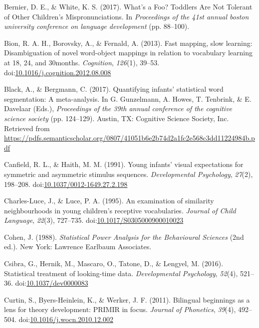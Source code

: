 \documentclass[man]{apa6}
\begin{document}
\leavevmode\hypertarget{ref-Bernier2017}{}%
Bernier, D. E., \& White, K. S. (2017). What's a Foo? Toddlers Are Not Tolerant of Other Children's Mispronunciations. In \emph{Proceedings of the 41st annual boston university conference on language development} (pp. 88--100).

\leavevmode\hypertarget{ref-Bion2013}{}%
Bion, R. A. H., Borovsky, A., \& Fernald, A. (2013). Fast mapping, slow learning: Disambiguation of novel word-object mappings in relation to vocabulary learning at 18, 24, and 30months. \emph{Cognition}, \emph{126}(1), 39--53. doi:\href{https://doi.org/10.1016/j.cognition.2012.08.008}{10.1016/j.cognition.2012.08.008}

\leavevmode\hypertarget{ref-Black2017}{}%
Black, A., \& Bergmann, C. (2017). Quantifying infants' statistical word segmentation: A meta-analysis. In G. Gunzelmann, A. Howes, T. Tenbrink, \& E. Davelaar (Eds.), \emph{Proceedings of the 39th annual conference of the cognitive science society} (pp. 124--129). Austin, TX: Cognitive Science Society, Inc. Retrieved from \url{https://pdfs.semanticscholar.org/0807/41051b6e2b74d2a1fc2e568c3dd11224984b.pdf}

\leavevmode\hypertarget{ref-Canfield1991}{}%
Canfield, R. L., \& Haith, M. M. (1991). Young infants' visual expectations for symmetric and asymmetric stimulus sequences. \emph{Developmental Psychology}, \emph{27}(2), 198--208. doi:\href{https://doi.org/10.1037/0012-1649.27.2.198}{10.1037/0012-1649.27.2.198}

\leavevmode\hypertarget{ref-CharlesLuce1995}{}%
Charles-Luce, J., \& Luce, P. A. (1995). An examination of similarity neighbourhoods in young children's receptive vocabularies. \emph{Journal of Child Language}, \emph{22}(3), 727--735. doi:\href{https://doi.org/10.1017/S0305000900010023}{10.1017/S0305000900010023}

\leavevmode\hypertarget{ref-cohen}{}%
Cohen, J. (1988). \emph{Statistical Power Analysis for the Behavioural Sciences} (2nd ed.). New York: Lawrence Earlbaum Associates.

\leavevmode\hypertarget{ref-Csibra2016}{}%
Csibra, G., Hernik, M., Mascaro, O., Tatone, D., \& Lengyel, M. (2016). Statistical treatment of looking-time data. \emph{Developmental Psychology}, \emph{52}(4), 521--36. doi:\href{https://doi.org/10.1037/dev0000083}{10.1037/dev0000083}

\leavevmode\hypertarget{ref-Curtin2011}{}%
Curtin, S., Byers-Heinlein, K., \& Werker, J. F. (2011). Bilingual beginnings as a lens for theory development: PRIMIR in focus. \emph{Journal of Phonetics}, \emph{39}(4), 492--504. doi:\href{https://doi.org/10.1016/j.wocn.2010.12.002}{10.1016/j.wocn.2010.12.002}
\end{document}
